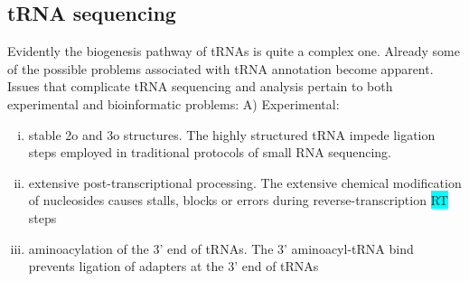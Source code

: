 \documentclass[12pt]{rockefeller}
\newcommand{\cyan}[1]{\colorbox{cyan}{#1}}
\begin{document}
\subsection{tRNA sequencing}
Evidently the biogenesis pathway of tRNAs is quite a complex one. 
Already some of the possible problems associated with tRNA annotation become apparent. 
Issues that complicate tRNA sequencing and analysis pertain to both experimental and bioinformatic problems:
A) Experimental:%
\vspace{-2.5mm}
\begin{enumerate}[i)]
\itemsep-0.5em 
\item stable 2o and 3o structures. The highly structured tRNA impede ligation steps employed in traditional protocols of small RNA sequencing.
\item extensive post-transcriptional processing. The extensive chemical modification of nucleosides causes stalls, blocks or errors during reverse-transcription \cyan{RT} steps
\item aminoacylation of the 3' end of tRNAs. The 3' aminoacyl-tRNA bind prevents ligation of adapters at the 3' end of tRNAs
\end{enumerate}
\end{document}
